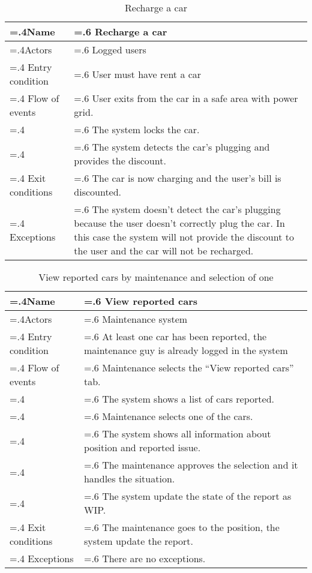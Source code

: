 \documentclass[10pt, a4paper,titlepage]{article}
\begin{document}
\begin{table}[h]
\caption{Recharge a car} \label{tab:scenario10}
\begin{tabularx}{\textwidth}{|>{\hsize=.4\hsize}X|>{\hsize=.6\hsize}X|}
\hline
Name & Recharge a car\\
\hline
Actors & Logged users\\ 
\hline
Entry condition & User must have rent a car\\
\hline
Flow of events & User exits from the car in a safe area with power grid.\\
& The system locks the car.\\
& The system detects the car's plugging and provides the discount.\\
\hline
Exit conditions & The car is now charging and the user's bill is discounted.\\
\hline
Exceptions & The system doesn’t detect the car’s plugging because the user doesn’t correctly plug the car. In this case the system will not provide the discount to the user and the car will not be recharged.\\
\hline
\end{tabularx}
\end{table}
\begin{table}[h]
\caption{View reported cars by maintenance and selection of one} \label{tab:scenario11}
\begin{tabularx}{\textwidth}{|>{\hsize=.4\hsize}X|>{\hsize=.6\hsize}X|}
\hline
Name & View reported cars\\
\hline
Actors & Maintenance system\\ 
\hline
Entry condition & At least one car has been reported, the maintenance guy is already logged in the system\\
\hline
Flow of events & Maintenance selects the “View reported cars” tab.\\
& The system shows a list of cars reported.\\
& Maintenance selects one of the cars.\\
& The system shows all information about position and reported issue.\\
& The maintenance approves the selection and it handles the situation.\\
& The system update the state of the report as WIP.\\
\hline
Exit conditions & The maintenance goes to the position, the system update the report.\\
\hline
Exceptions & There are no exceptions.\\
\hline
\end{tabularx}
\end{table}
\end{document}

